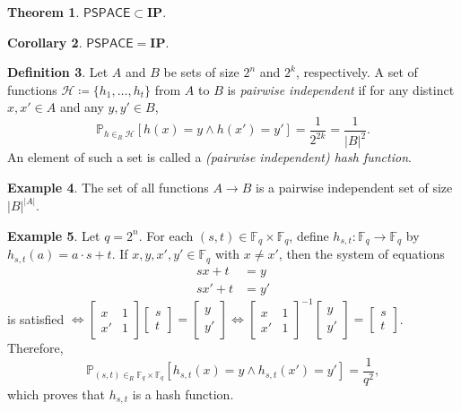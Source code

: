 \documentclass[10pt,letterpaper,cm]{nupset}
\theoremstyle{definition}
\newtheorem{definition}{Definition}[subsection]
\newtheorem{exmp}[definition]{Example}
\theoremstyle{theorem}
\newtheorem{theorem}[definition]{Theorem}
\newtheorem{corollary}[definition]{Corollary}
\theoremstyle{remark}
\newcommand{\F}{\mathbb F}
\renewcommand{\H}{\mathcal H}
\newcommand{\1}{\mathbf{1}}
\newcommand{\0}{\vec 0}
\begin{document}
\begin{theorem}
$\mathsf{PSPACE} \subset \mathbf{IP}$.
\end{theorem}

\begin{corollary}
$\mathsf{PSPACE} = \mathbf{IP}$.
\end{corollary}

\begin{definition}
Let $A$ and $B$ be sets of size $2^n$ and $2^k$, respectively. A set of functions $\H\coloneqq \{h_1, \ldots, h_t\}$ from $A$ to $B$ is \textit{pairwise independent} if for any distinct $x, x' \in A$ and any $y, y' \in B$, $$  \mathbb{P}_{h \in_R \H}[h(x) = y \land h(x') = y'] = \frac{1}{2^{2k}}  = \frac{1}{|B|^2}.$$ An element of such a set is called a \textit{(pairwise independent) hash function}.
\end{definition}

\begin{exmp}
The set of all functions $A \to B$ is a pairwise independent set of size $|B|^{|A|}$. 
\end{exmp}

\begin{exmp}
Let $q= 2^n$. For each $(s,t) \in \F_q \times \F_q$, define $h_{s,t} : \F_q \to \F_q$ by $h_{s,t}(a) = a \cdot s +t$. If $x,y, x', y' \in \F_q$ with $x \ne x'$, then the system of equations \begin{align*} 
sx + t & = y \\ sx' +t & = y'
\end{align*} 
is satisfied $\iff  \begin{bmatrix}  x & 1 \\ x' & 1   \end{bmatrix} \begin{bmatrix} s \\ t    \end{bmatrix} = \begin{bmatrix} y \\ y' \end{bmatrix} \iff  \begin{bmatrix}  x & 1 \\ x' & 1   \end{bmatrix}^{-1} \begin{bmatrix} y \\ y' \end{bmatrix}  = \begin{bmatrix} s \\ t    \end{bmatrix} $. Therefore, $$\mathbb{P}_{(s,t)\in_R \F_q\times \F_q}\left[h_{s,t}(x) = y \land h_{s,t}(x') = y'\right] = \frac{1}{q^2},$$ which proves that $h_{s,t}$ is a hash function.
\end{exmp}
\end{document}
